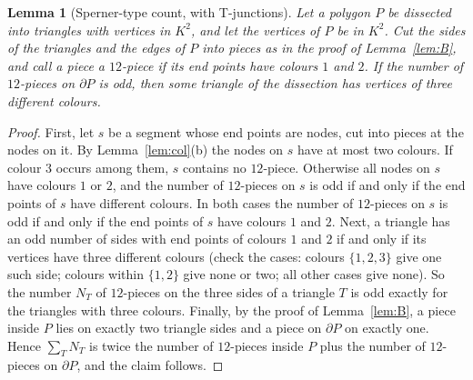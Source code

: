 \documentclass[11pt]{article}
\newtheorem{lemma}[theorem]{Lemma}
\theoremstyle{definition}
\begin{document}
\begin{lemma}[Sperner-type count, with T-junctions]\label{lem:sperner}
Let a polygon $P$ be dissected into triangles with vertices in $K^2$, and let the vertices of $P$ be
in $K^2$. Cut the sides of the triangles and the edges of $P$ into pieces as in the proof of
Lemma~\ref{lem:B}, and call a piece a \emph{$12$-piece} if its end points have colours $1$ and $2$.
If the number of $12$-pieces on $\partial P$ is odd, then some triangle of the dissection has
vertices of three different colours.
\end{lemma}

\begin{proof}
First, let $s$ be a segment whose end points are nodes, cut into pieces at the nodes on it. By
Lemma~\ref{lem:col}(b) the nodes on $s$ have at most two colours. If colour $3$ occurs among them,
$s$ contains no $12$-piece. Otherwise all nodes on $s$ have colours $1$ or $2$, and the number of
$12$-pieces on $s$ is odd if and only if the end points of $s$ have different colours. In both cases
the number of $12$-pieces on $s$ is odd if and only if the end points of $s$ have colours $1$ and
$2$. Next, a triangle has an odd number of sides with end points of colours $1$ and $2$ if and only
if its vertices have three different colours (check the cases: colours $\{1,2,3\}$ give one such
side; colours within $\{1,2\}$ give none or two; all other cases give none). So the number $N_T$ of
$12$-pieces on the three sides of a triangle $T$ is odd exactly for the triangles with three
colours. Finally, by the proof of Lemma~\ref{lem:B}, a piece inside $P$ lies on exactly two triangle
sides and a piece on $\partial P$ on exactly one. Hence $\sum_TN_T$ is twice the number of
$12$-pieces inside $P$ plus the number of $12$-pieces on $\partial P$, and the claim follows.
\end{proof}
\end{document}
